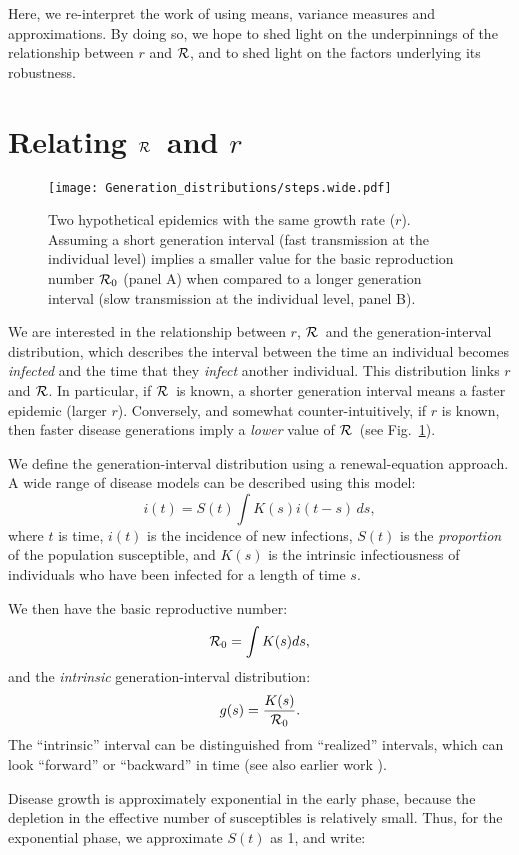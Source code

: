 \documentclass[12pt,]{article}
\newcommand{\RR}{\ensuremath{{\cal R}}}
\newcommand{\Rx}[1]{\ensuremath{{\cal R}_{#1}}}
\newcommand{\Ro}{\Rx{0}}
\newcommand{\fref}[1]{Fig.~\ref{fig:#1}}
\begin{document}
Here, we re-interpret the work of \cite{WallLips07} using means, variance measures and approximations.
By doing so, we hope to shed light on the underpinnings of the relationship between $r$ and \RR, and to shed light on the factors underlying its robustness.

\section{Relating \RR\ and $r$}

\begin{figure}[htbp] \centering
	\texttt{[image: Generation\_distributions/steps.wide.pdf]}
	\caption{Two hypothetical epidemics with the same growth rate ($r$).  Assuming a short generation interval (fast transmission at the individual level) implies a smaller value for the basic reproduction number $\Ro$ (panel A) when compared to a longer generation interval (slow transmission at the individual level, panel B).
	\label{fig:link}}
\end{figure}

We are interested in the relationship between $r$, \RR~and the generation-interval distribution, which describes the interval between the time an individual becomes \emph{infected} and the time that they \emph{infect} another individual.
This distribution links $r$ and \RR. In particular, if \RR~is known, a shorter generation interval means a faster epidemic (larger $r$). Conversely, and somewhat counter-intuitively, if $r$ is known, then faster disease generations imply a \emph{lower} value of \RR~(see \fref{link}).

We define the generation-interval distribution using a renewal-equation approach.
A wide range of disease models can be described using this model: $$i(t) = S(t)\int{K(s)i(t-s) \,ds},$$ where $t$ is time, $i(t)$ is the incidence of new infections, $S(t)$ is the \emph{proportion} of the population susceptible, and $K(s)$ is the intrinsic infectiousness of individuals who have been infected for a length of time $s$.

We then have the basic reproductive number: $$\Ro = \int{K(s)ds},$$ and the \emph{intrinsic} generation-interval distribution:
$$g(s) = \frac{K(s)}{\Ro}.$$ 
The ``intrinsic'' interval can be distinguished from ``realized'' intervals, which can look ``forward'' or ``backward'' in time \cite{ChamDush15} (see also earlier work \cite{Sven07,Nish10}).

Disease growth is approximately exponential in the early phase, because the depletion in the effective number of susceptibles is relatively small.
Thus, for the exponential phase, we approximate $S(t)$ as 1, and write:
\end{document}
